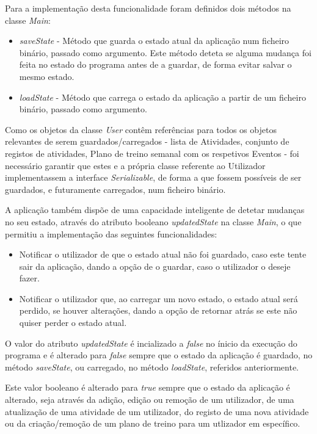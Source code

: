 \documentclass[a4paper,12pt]{scrreprt}
\begin{document}
Para a implementação desta funcionalidade foram definidos dois métodos na classe \textit{Main}:
\begin{itemize}
    \item \textit{saveState} - Método que guarda o estado atual da aplicação num ficheiro binário, passado como argumento. Este método deteta se alguma mudança foi feita no estado do programa antes de a guardar, de forma evitar salvar o mesmo estado.
    \item \textit{loadState} - Método que carrega o estado da aplicação a partir de um ficheiro binário, passado como argumento.
\end{itemize}

Como os objetos da classe \textit{User} contêm referências para todos os objetos relevantes de serem guardados/carregados - lista de Atividades, conjunto de registos de atividades, Plano de treino semanal com os respetivos Eventos - foi necessário garantir que estes e a própria classe referente ao Utilizador implementassem a interface \textit{Serializable}, de forma a que fossem possíveis de ser guardados, e futuramente carregados, num ficheiro binário.

A aplicação também dispõe de uma capacidade inteligente de detetar mudanças no seu estado, através do atributo booleano \textit{updatedState} na classe \textit{Main}, o que permitiu a implementação das seguintes funcionalidades:

\begin{itemize}
    \item Notificar o utilizador de que o estado atual não foi guardado, caso este tente sair da aplicação, dando a opção de o guardar, caso o utilizador o deseje fazer.
    \item Notificar o utilizador que, ao carregar um novo estado, o estado atual será perdido, se houver alterações, dando a opção de retornar atrás se este não quiser perder o estado atual.
\end{itemize}

O valor do atributo \textit{updatedState} é incializado a \textit{false} no ínicio da execução do programa e é alterado para \textit{false} sempre que o estado da aplicação é guardado, no método \textit{saveState}, ou carregado, no método \textit{loadState}, referidos anteriormente.

Este valor booleano é alterado para \textit{true} sempre que o estado da aplicação é alterado, seja através da adição, edição ou remoção de um utilizador, de uma atualização de uma atividade de um utilizador, do registo de uma nova atividade ou da criação/remoção de um plano de treino para um utlizador em específico.
\end{document}
